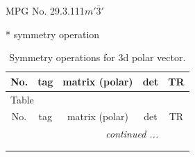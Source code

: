 \documentclass[fleqn,8pt]{jsarticle}
\begin{document}
\setcounter{MaxMatrixCols}{32}

\renewcommand{\tablename}{Table~}
\renewcommand{\figurename}{Figure~}
\begin{center}
\LARGE
MPG No. 29.3.111\quad$m'\bar{3}'$
\end{center}
* symmetry operation
\renewcommand{\arraystretch}{1.3}
\begin{longtable}{ccccc}
\caption{Symmetry operations for 3d polar vector.}
 \\
 \hline \hline
No. & tag & matrix (polar) & det & TR \\ \hline \endfirsthead

\multicolumn{4}{l}{\tablename\ \thetable{}} \\
 \hline \hline
No. & tag & matrix (polar) & det & TR \\ \hline \endhead

 \hline \hline
\multicolumn{4}{r}{\footnotesize\it continued ...} \\ \endfoot

 \hline \hline
\multicolumn{4}{r}{} \\ \endlastfoot


\end{longtable}
\end{document}
